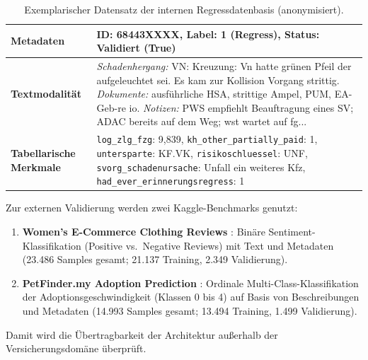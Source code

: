 \begin{table}[ht]
    \centering
    \small
    \renewcommand{\arraystretch}{1.3}
    \caption{Exemplarischer Datensatz der internen Regressdatenbasis (anonymisiert).}
    \label{tab:sample_case}
    \begin{tabular}{@{}lp{}@{}}
        \hline
        \textbf{Metadaten} & ID: 68443XXXX, Label: 1 (Regress), Status: Validiert (True)\\
        \hline
        \textbf{Textmodalität} & \textit{Schadenhergang:} VN: Kreuzung: Vn hatte grünen Pfeil der aufgeleuchtet sei. Es kam zur Kollision Vorgang strittig. \textit{Dokumente:} ausführliche HSA, strittige Ampel, PUM, EA-Geb-re io. \textit{Notizen:} PWS empfiehlt Beauftragung eines SV; ADAC bereits auf dem Weg; wst wartet auf fg... \\
        \hline
        \textbf{Tabellarische Merkmale} & \texttt{log\_zlg\_fzg}: 9,839, \texttt{kh\_other\_partially\_paid}: 1, \texttt{untersparte}: KF.VK, \texttt{risikoschluessel}: UNF, \texttt{svorg\_schadenursache}: Unfall ein weiteres Kfz, \texttt{had\_ever\_erinnerungsregress}: 1 \\
        \hline
    \end{tabular}
\end{table}

\newpage
Zur externen Validierung werden zwei Kaggle-Benchmarks genutzt:
\begin{enumerate}
    \item \textbf{Women's E-Commerce Clothing Reviews} \cite{KaggleEcommerce}: Binäre Sentiment-Klassifikation (Positive vs.\ Negative Reviews) mit Text und Metadaten (23.486 Samples gesamt; 21.137 Training, 2.349 Validierung).
    \item \textbf{PetFinder.my Adoption Prediction} \cite{KagglePetfinder}: Ordinale Multi-Class-Klassifikation der Adoptionsgeschwindigkeit (Klassen 0 bis 4) auf Basis von Beschreibungen und Metadaten (14.993 Samples gesamt; 13.494 Training, 1.499 Validierung).
\end{enumerate}
Damit wird die Übertragbarkeit der Architektur außerhalb der Versicherungsdomäne überprüft.

